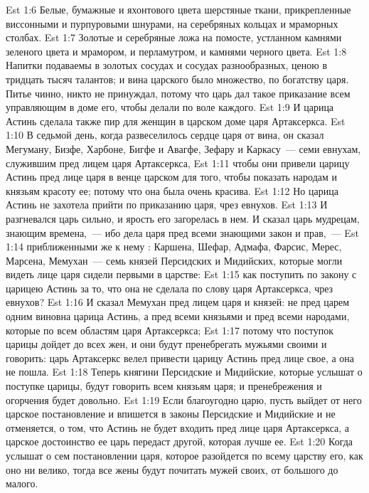 \vs Est 1:6 Белые, бумажные и яхонтового цвета шерстяные ткани, прикрепленные виссонными и пурпуровыми шнурами,  на серебряных кольцах и мраморных столбах.
\vs Est 1:7 Золотые и серебряные ложа  на помосте, устланном камнями зеленого цвета и мрамором, и перламутром, и камнями черного цвета.
\vs Est 1:8 Напитки подаваемы  в золотых сосудах и сосудах разнообразных, ценою в тридцать тысяч талантов; и вина царского было множество, по богатству царя. Питье  чинно, никто не принуждал, потому что царь дал такое приказание всем управляющим в доме его, чтобы делали по воле каждого.
\vs Est 1:9 И царица Астинь сделала также пир для женщин в царском доме царя Артаксеркса.
\vs Est 1:10 В седьмой день, когда развеселилось сердце царя от вина, он сказал Мегуману, Бизфе, Харбоне, Бигфе и Авагфе, Зефару и Каркасу~--- семи евнухам, служившим пред лицем царя Артаксеркса,
\vs Est 1:11 чтобы они привели царицу Астинь пред лице царя в венце царском для того, чтобы показать народам и князьям красоту ее; потому что она была очень красива.
\vs Est 1:12 Но царица Астинь не захотела прийти по приказанию царя,  чрез евнухов.
\vs Est 1:13 И разгневался царь сильно, и ярость его загорелась в нем. И сказал царь мудрецам, знающим  времена,~--- ибо дела царя  пред всеми знающими закон и прав,~---
\vs Est 1:14 приближенными же к нему : Каршена, Шефар, Адмафа, Фарсис, Мерес, Марсена, Мемухан~--- семь князей Персидских и Мидийских, которые могли видеть лице царя  сидели первыми в царстве:
\vs Est 1:15 как поступить по закону с царицею Астинь за то, что она не сделала по слову царя Артаксеркса,  чрез евнухов?
\vs Est 1:16 И сказал Мемухан пред лицем царя и князей: не пред царем одним виновна царица Астинь, а пред всеми князьями и пред всеми народами, которые по всем областям царя Артаксеркса;
\vs Est 1:17 потому что поступок царицы дойдет до всех жен, и они будут пренебрегать мужьями своими и говорить: царь Артаксеркс велел привести царицу Астинь пред лице свое, а она не пошла.
\vs Est 1:18 Теперь княгини Персидские и Мидийские, которые услышат о поступке царицы, будут  говорить всем князьям царя; и пренебрежения и огорчения будет довольно.
\vs Est 1:19 Если благоугодно царю, пусть выйдет от него царское постановление и впишется в законы Персидские и Мидийские и не отменяется, о том, что Астинь не будет входить пред лице царя Артаксеркса, а царское достоинство ее царь передаст другой, которая лучше ее.
\vs Est 1:20 Когда услышат о сем постановлении царя, которое разойдется по всему царству его, как оно ни велико, тогда все жены будут почитать мужей своих, от большого до малого.
